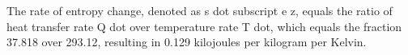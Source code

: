 The rate of entropy change, denoted as s dot subscript e z, equals the ratio of heat transfer rate Q dot over temperature rate T dot, which equals the fraction 37.818 over 293.12, resulting in 0.129 kilojoules per kilogram per Kelvin.